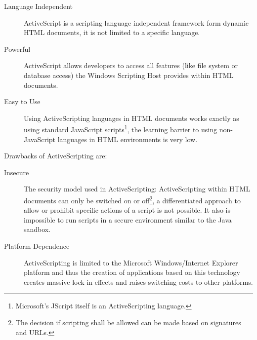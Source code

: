 \begin{description}
	
	\item [Language Independent] ActiveScript is a scripting language independent framework form dynamic HTML documents, it is not limited to a specific language.
	
	\item [Powerful] ActiveScript allows developers to access all features (like file system or database access) the Windows Scripting Host provides within HTML documents.
	
	\item [Easy to Use] Using ActiveScripting languages in HTML documents works exactly as using standard JavaScript scripts\footnote{Microsoft's JScript itself is an ActiveScripting language.}, the learning barrier to using non-JavaScript languages in HTML environments is very low.

\end{description}

Drawbacks of ActiveScripting are:

\begin{description}
  
  \item [Insecure] The security model used in ActiveScripting: ActiveScripting within HTML documents can only be switched on or off\footnote{The decision if scripting shall be allowed can be made based on signatures and URLs.}, a differentiated approach to allow or prohibit specific actions of a script is not possible. It also is impossible to run scripts in a secure environment similar to the Java sandbox.
  
  \item [Platform Dependence] ActiveScripting is limited to the Microsoft Windows/Internet Explorer platform and thus the creation of applications based on this technology creates massive lock-in effects and raises switching costs to other platforms.
  
\end{description}